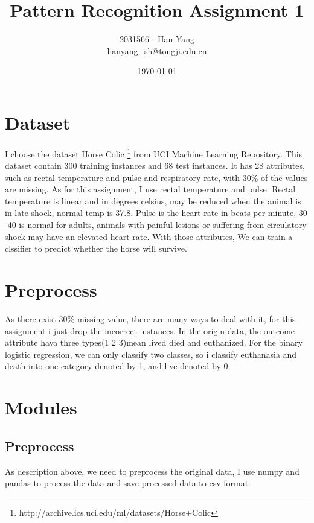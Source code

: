 \documentclass[11pt,a4paper]{article}
\begin{document}
\title{Pattern Recognition Assignment 1}
\author{2031566 - Han Yang \\
{\small{hanyang\_sh@tongji.edu.cn}}
}
\date{\today}
\maketitle

\section{Dataset}
I choose the dataset Horse Colic \footnote{http://archive.ics.uci.edu/ml/datasets/Horse+Colic} from UCI Machine Learning Repository.
This dataset contain 300 training instances and 68 test instances. It has 28 attributes, such as rectal temperature and pulse and 
respiratory rate, with  30\% of the values are missing. As for this assignment, I use rectal temperature and pulse. Rectal temperature
is linear and in degrees celsius, may be reduced when the animal is in late shock, normal temp is 37.8. Pulse is the heart rate in
beats per minute, 30 -40 is normal for adults, animals with painful lesions or suffering from circulatory shock may have an elevated 
heart rate. With those attributes, We can train a clssifier to predict whether the horse will survive.


\section{Preprocess}
As there exist 30\% missing value, there are many ways to deal with it, for this assignment i just drop the incorrect instances. In the
origin data, the outcome attribute hava three types(1 2 3)mean lived died and euthanized. For the binary logistic regression, we can
only classify two classes, so i classify euthanasia and death into one category denoted by 1, and live denoted by 0.

\section{Modules}

    \subsection{Preprocess}
        As description above, we need to preprocess the original data, I use numpy and pandas to process the data and save processed
        data to csv format.
    
\end{document}

